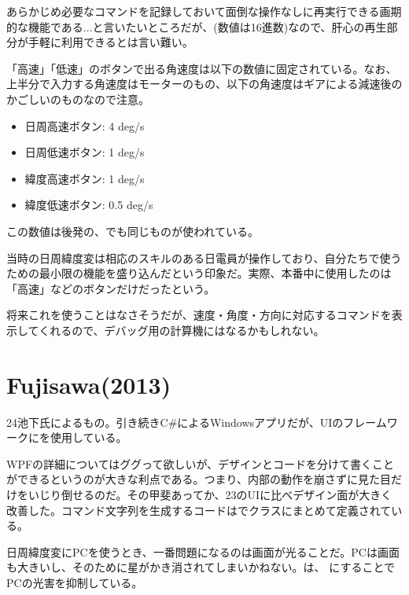 \documentclass[letterpaper,10pt,dvipdfmx]{sphinxmanual}
\begin{document}
あらかじめ必要なコマンドを記録しておいて面倒な操作なしに再実行できる画期的な機能である...と言いたいところだが、(数値は16進数)なので、肝心の再生部分が手軽に利用できるとは言い難い。

「高速」「低速」のボタンで出る角速度は以下の数値に固定されている。なお、上半分で入力する角速度はモーターのもの、以下の角速度はギアによる減速後のかごしいのものなので注意。
\begin{itemize}
\item {} 
日周高速ボタン: 4 deg/s

\item {} 
日周低速ボタン: 1 deg/s

\item {} 
緯度高速ボタン: 1 deg/s

\item {} 
緯度低速ボタン: 0.5 deg/s

\end{itemize}

この数値は後発の、でも同じものが使われている。

当時の日周緯度変は相応のスキルのある日電員が操作しており、自分たちで使うための最小限の機能を盛り込んだという印象だ。実際、本番中に使用したのは「高速」などのボタンだけだったという。

将来これを使うことはなさそうだが、速度・角度・方向に対応するコマンドを表示してくれるので、デバッグ用の計算機にはなるかもしれない。


\section{Fujisawa(2013)}
\label{\detokenize{nissyu-idohen/pc-software-history:fujisawa-2013}}

24池下氏によるもの。引き続きC\#によるWindowsアプリだが、UIのフレームワークにを使用している。

WPFの詳細についてはググって欲しいが、デザインとコードを分けて書くことができるというのが大きな利点である。つまり、内部の動作を崩さずに見た目だけをいじり倒せるのだ。その甲斐あってか、23のUIに比べデザイン面が大きく改善した。コマンド文字列を生成するコードはでクラスにまとめて定義されている。

日周緯度変にPCを使うとき、一番問題になるのは画面が光ることだ。PCは画面も大きいし、そのために星がかき消されてしまいかねない。は、 にすることでPCの光害を抑制している。
\end{document}
